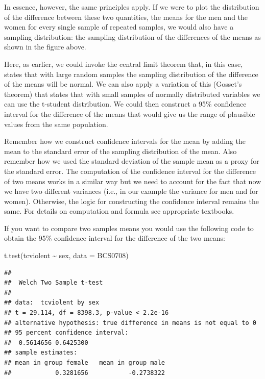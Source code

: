 \documentclass[
]{book}
\newenvironment{Shaded}{\begin{snugshade}}{\end{snugshade}}
\newcommand{\AttributeTok}[1]{\textcolor[rgb]{0.77,0.63,0.00}{#1}}
\newcommand{\FunctionTok}[1]{\textcolor[rgb]{0.00,0.00,0.00}{#1}}
\newcommand{\NormalTok}[1]{#1}
\newcommand{\SpecialCharTok}[1]{\textcolor[rgb]{0.00,0.00,0.00}{#1}}
\begin{document}
In essence, however, the same principles apply. If we were to plot the distribution of the difference between these two quantities, the means for the men and the women for every single sample of repeated samples, we would also have a sampling distribution: the sampling distribution of the differences of the means as shown in the figure above.

Here, as earlier, we could invoke the central limit theorem that, in this case, states that with large random samples the sampling distribution of the difference of the means will be normal. We can also apply a variation of this (Gosset's theorem) that states that with small samples of normally distributed variables we can use the t-student distribution. We could then construct a 95\% confidence interval for the difference of the means that would give us the range of plausible values from the same population.

Remember how we construct confidence intervals for the mean by adding the mean to the standard error of the sampling distribution of the mean. Also remember how we used the standard deviation of the sample mean as a proxy for the standard error. The computation of the confidence interval for the difference of two means works in a similar way but we need to account for the fact that now we have two different variances (i.e., in our example the variance for men and for women). Otherwise, the logic for constructing the confidence interval remains the same. For details on computation and formula see appropriate textbooks.

If you want to compare two samples means you would use the following code to obtain the 95\% confidence interval for the difference of the two means:

\begin{Shaded}
\begin{Highlighting}[]
\FunctionTok{t.test}\NormalTok{(tcviolent }\SpecialCharTok{\textasciitilde{}}\NormalTok{ sex, }\AttributeTok{data =}\NormalTok{ BCS0708)}
\end{Highlighting}
\end{Shaded}

\begin{verbatim}
## 
##  Welch Two Sample t-test
## 
## data:  tcviolent by sex
## t = 29.114, df = 8398.3, p-value < 2.2e-16
## alternative hypothesis: true difference in means is not equal to 0
## 95 percent confidence interval:
##  0.5614656 0.6425300
## sample estimates:
## mean in group female   mean in group male 
##            0.3281656           -0.2738322
\end{verbatim}
\end{document}

